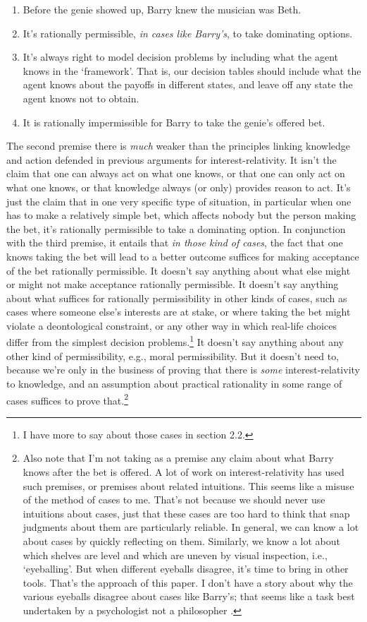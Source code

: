 \begin{enumerate}
\item Before the genie showed up, Barry knew the musician was Beth.
\item It's rationally permissible, \textit{in cases like Barry's}, to take dominating options.
\item It's always right to model decision problems by including what the agent knows in the `framework'. That is, our decision tables should include what the agent knows about the payoffs in different states, and leave off any state the agent knows not to obtain.
\item It is rationally impermissible for Barry to take the genie's offered bet.
\end{enumerate}

\noindent The second premise there is \textit{much} weaker than the principles linking knowledge and action defended in previous arguments for interest-relativity. It isn't the claim that one can always act on what one knows, or that one can only act on what one knows, or that knowledge always (or only) provides reason to act. It's just the claim that in one very specific type of situation, in particular when one has to make a relatively simple bet, which affects nobody but the person making the bet, it's rationally permissible to take a dominating option. In conjunction with the third premise, it entails that \textit{in those kind of cases}, the fact that one knows taking the bet will lead to a better outcome suffices for making acceptance of the bet rationally permissible. It doesn't say anything about what else might or might not make acceptance rationally permissible. It doesn't say anything about what suffices for rationally permissibility in other kinds of cases, such as cases where someone else's interests are at stake, or where taking the bet might violate a deontological constraint, or any other way in which real-life choices differ from the simplest decision problems.\footnote{I have more to say about those cases in section 2.2.} It doesn't say anything about any other kind of permissibility, e.g., moral permissibility. But it doesn't need to, because we're only in the business of proving that there is \textit{some} interest-relativity to knowledge, and an assumption about practical rationality in some range of cases suffices to prove that.\footnote{Also note that I'm not taking as a premise any claim about what Barry knows after the bet is offered. A lot of work on interest-relativity has used such premises, or premises about related intuitions. This seems like a misuse of the method of cases to me. That's not because we should never use intuitions about cases, just that these cases are too hard to think that snap judgments about them are particularly reliable. In general, we can know a lot about cases by quickly reflecting on them. Similarly, we know a lot about which shelves are level and which are uneven by visual inspection, i.e., `eyeballing'. But when different eyeballs disagree, it's time to bring in other tools. That's the approach of this paper. I don't have a story about why the various eyeballs disagree about cases like Barry's; that seems like a task best undertaken by a psychologist not a philosopher \citep{Ichikawa2009}.}

